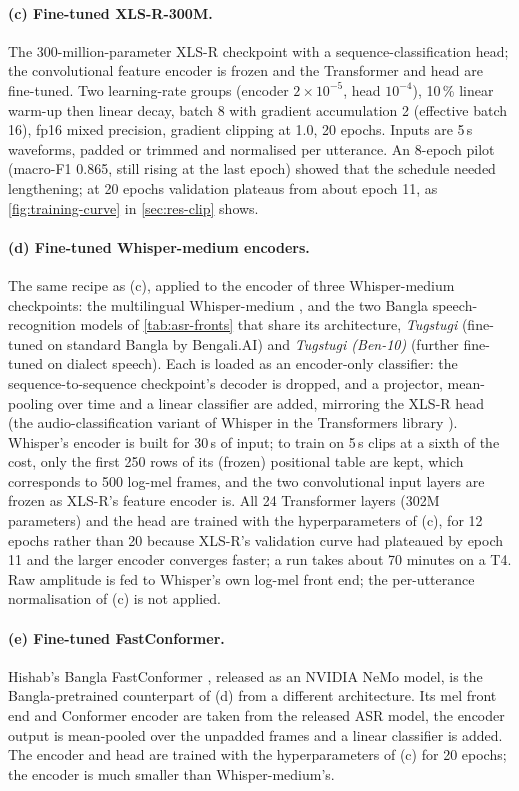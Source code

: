 \paragraph{(c) Fine-tuned XLS-R-300M.} The 300-million-parameter XLS-R
checkpoint \cite{Babu2022XLSR} with a sequence-classification head; the
convolutional feature encoder is frozen and the Transformer and head are
fine-tuned. Two learning-rate groups (encoder $2\times10^{-5}$, head
$10^{-4}$), 10\,\% linear warm-up then linear decay, batch 8 with gradient
accumulation 2 (effective batch 16), fp16 mixed precision, gradient clipping at
1.0, 20 epochs. Inputs are 5\,s waveforms, padded or trimmed and normalised per
utterance. An 8-epoch pilot (macro-F1 0.865, still rising at the last epoch)
showed that the schedule needed lengthening; at 20 epochs validation plateaus
from about epoch 11, as \cref{fig:training-curve} in \cref{sec:res-clip} shows.

\paragraph{(d) Fine-tuned Whisper-medium encoders.} The same recipe as (c),
applied to the encoder of three Whisper-medium checkpoints: the multilingual
Whisper-medium \cite{Radford2023Robust}, and the two Bangla speech-recognition
models of \cref{tab:asr-fronts} that share its architecture, \emph{Tugstugi}
(fine-tuned on standard Bangla by Bengali.AI) and \emph{Tugstugi (Ben-10)}
(further fine-tuned on dialect speech). Each is loaded as an encoder-only
classifier: the sequence-to-sequence checkpoint's decoder is dropped, and a
projector, mean-pooling over time and a linear classifier are added, mirroring
the XLS-R head (the audio-classification variant of Whisper in the Transformers
library \cite{Wolf2020Transformers}). Whisper's encoder is built for 30\,s of
input; to train on 5\,s clips at a sixth of the cost, only the first 250 rows
of its (frozen) positional table are kept, which corresponds to 500 log-mel
frames, and the two convolutional input layers are frozen as XLS-R's feature
encoder is. All 24 Transformer layers (302M parameters) and the head are
trained with the hyperparameters of (c), for 12 epochs rather than 20 because
XLS-R's validation curve had plateaued by epoch 11 and the larger encoder
converges faster; a run takes about 70 minutes on a T4. Raw amplitude is fed to
Whisper's own log-mel front end; the per-utterance normalisation of (c) is not
applied.

\paragraph{(e) Fine-tuned FastConformer.} Hishab's Bangla FastConformer
\cite{Hishab2023FastConformer}, released as an NVIDIA NeMo model, is the
Bangla-pretrained counterpart of (d) from a different architecture. Its mel
front end and Conformer encoder are taken from the released ASR model, the
encoder output is mean-pooled over the unpadded frames and a linear classifier
is added. The encoder and head are trained with the hyperparameters of (c) for
20 epochs; the encoder is much smaller than Whisper-medium's.

